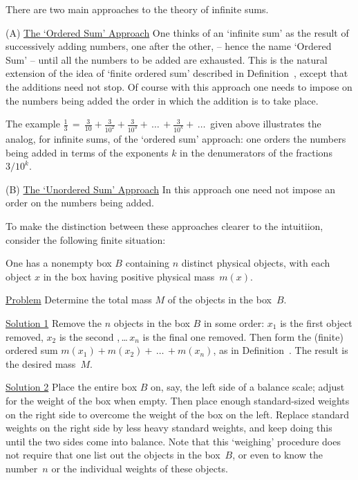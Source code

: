\V
\V

        There are two main approaches to the theory of infinite sums.

\V

        (A) \underline{The `Ordered Sum' Approach} One thinks of an `infinite sum' as the result of successively adding numbers, one after the other,
        -- hence the name `Ordered Sum' -- until all the numbers to be added are exhausted.
    This is the natural extension of the idea of `finite ordered sum' described  in Definition~, except that the additions need not stop.
    Of course with this approach one needs to impose on the numbers being added the order in which the addition is to take place.

        The example ${\displaystyle \frac{1}{3} \,=\, \frac{3}{10} + \frac{3}{10^{2}} + \frac{3}{10^{3}} + \,{\ldots}\,+ \frac{3}{10^{k}} + \,{\ldots}\,
}$ given above illustrates the analog, for infinite sums, of the `ordered sum' approach:
    one orders the numbers being added in terms of the exponents $k$ in the denumerators of the fractions $3/10^{k}$.

\VA

        (B) \underline{The `Unordered Sum' Approach} In this approach one need not impose an order on the numbers being added.%

\V

        To make the distinction between these approaches clearer to the intuitiion, consider the following finite situation:

        One has a nonempty box $B$ containing $n$ distinct physical objects, with each object $x$ in the box having positive physical mass~$m(x)$.


        \underline{Problem} Determine the total mass $M$ of the objects in the box~$B$.

        \h \underline{Solution 1} Remove the $n$ objects in the box $B$ in some order: $x_{1}$ is the first object removed, $x_{2}$ is the second ,\,{\ldots}\,$x_{n}$ is the final one removed.
    Then form the (finite) ordered sum $m(x_{1}) + m(x_{2}) + \,{\ldots}\, + m(x_{n})$, as in Definition~. The result is the desired mass~$M$.

\VA

        \h  \underline{Solution 2} Place the entire box $B$ on, say, the left side of a balance scale; adjust for the weight of the box when empty.
    Then place enough standard-sized weights on the right side to overcome the weight of the box on the left.
    Replace standard weights on the right side by less heavy standard weights, and keep doing this until the two sides come into balance.
    Note that this `weighing' procedure does not require that one list out the objects in the box~$B$,
    or even to know the number~$n$ or the individual weights of these objects.

